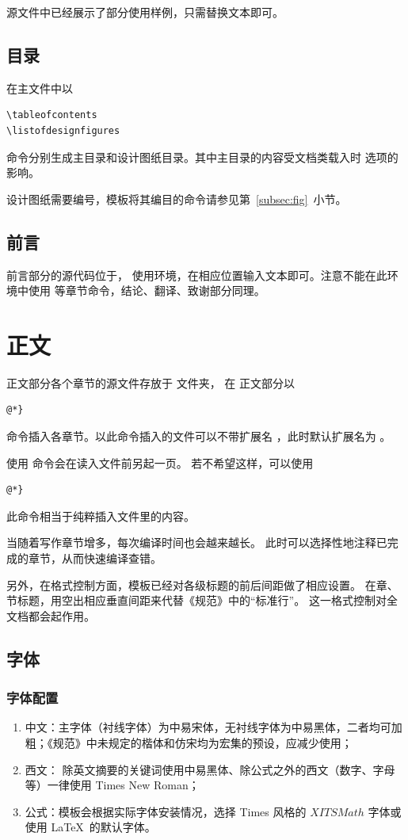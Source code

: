 源文件中已经展示了部分使用样例，只需替换文本即可。

\subsection{目录}\label{subsec:content}
在主文件中以
\begin{lstlisting}[numbers=none]
\tableofcontents
\listofdesignfigures
\end{lstlisting}
命令分别生成主目录和设计图纸目录。其中主目录的内容受文档类载入时  选项的影响。

设计图纸需要编号，模板将其编目的命令请参见第~\ref{subsec:fig}~小节。


\subsection{前言}\label{subsec:foreword}
前言部分的源代码位于，
使用环境，在相应位置输入文本即可。注意不能在此环境中使用
等章节命令，结论、翻译、致谢部分同理。

\section{正文}
正文部分各个章节的源文件存放于  文件夹，
在  正文部分以

\begin{lstlisting}[numbers=none]
@*}
	\end{lstlisting}
命令插入各章节。以此命令插入的文件可以不带扩展名
，此时默认扩展名为 。

使用  命令会在读入文件前另起一页。
若不希望这样，可以使用
\begin{lstlisting}[numbers=none]
@*}
	\end{lstlisting}
此命令相当于纯粹插入文件里的内容。

当随着写作章节增多，每次编译时间也会越来越长。
此时可以选择性地注释已完成的章节，从而快速编译查错。

另外，在格式控制方面，模板已经对各级标题的前后间距做了相应设置。
在章、节标题，用空出相应垂直间距来代替《规范》中的“标准行”。
这一格式控制对全文档都会起作用。
\subsection{字体}
\subsubsection{字体配置}
\begin{enumerate}
	\item 中文：主字体（衬线字体）为中易宋体，无衬线字体为中易黑体，二者均可加粗；《规范》中未规定的楷体和仿宋均为宏集的预设，应减少使用；
	\item 西文： 除英文摘要的关键词使用中易黑体、除公式之外的西文（数字、字母等）一律使用 Times New Roman；
	\item 公式：模板会根据实际字体安装情况，选择 Times 风格的 $XITSMath$ 字体或使用 \LaTeX\ 的默认字体。
\end{enumerate}

